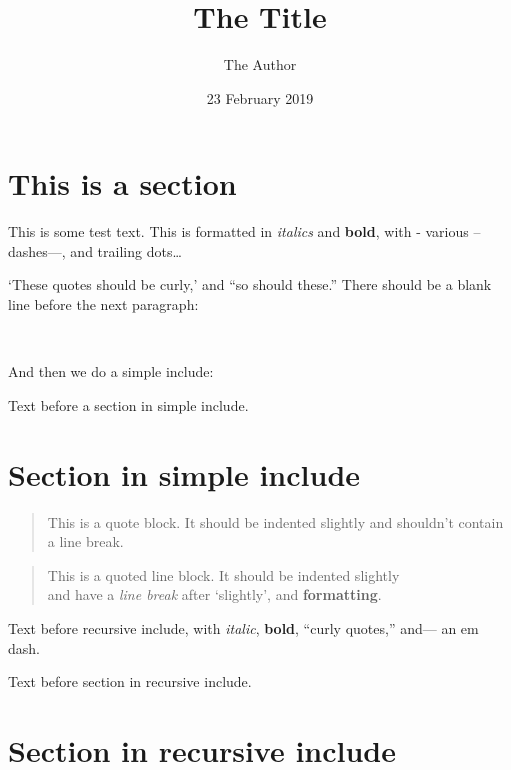 \documentclass[
  12pt,
  british,
  a4paper,
]{article}
\title{The Title}
\author{The Author}
\date{23 February 2019}
\begin{document}
\maketitle

\frenchspacing

{
\hypersetup{linkcolor=}
\setcounter{tocdepth}{1}
\tableofcontents
}

\hypertarget{this-is-a-section}{%
\section{This is a section}\label{this-is-a-section}}

This is some test text. This is formatted in \emph{italics} and
\textbf{bold}, with - various -- dashes---, and trailing dots\ldots{}

`These quotes should be curly,' and ``so should these.'' There should be
a blank line before the next paragraph:

~

And then we do a simple include:

Text before a section in simple include.

\hypertarget{section-in-simple-include}{%
\section{Section in simple include}\label{section-in-simple-include}}

\begin{quote}
This is a quote block. It should be indented slightly and shouldn't
contain a line break.
\end{quote}

\begin{quote}
This is a quoted line block. It should be indented slightly\\
and have a \emph{line break} after `slightly', and \textbf{formatting}.
\end{quote}

Text before recursive include, with \emph{italic}, \textbf{bold},
``curly quotes,'' and--- an em dash.

Text before section in recursive include.

\hypertarget{section-in-recursive-include}{%
\section{Section in recursive
include}\label{section-in-recursive-include}}
\end{document}
